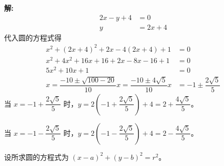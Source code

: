 \documentclass[10pt]{article}
\newcommand{\sol}{\textbf{解:} }
\begin{document}
\begin{enumerate}[leftmargin=*]
\begin{enumerate}
                \sol{}
                \begin{align*}
                  2 x-y+4 & = 0      \\
                  y       & = 2x + 4
                \end{align*}
                代入圆的方程式得
                \begin{align*}
                  x^{2} + (2x + 4)^{2} + 2x - 4(2x + 4) + 1                                   & = 0                           \\
                  x^{2} + 4x^{2} + 16x + 16 + 2x - 8x - 16 + 1                                & = 0                           \\
                  5x^{2} + 10x + 1                                                            & = 0                           \\
                  x = \dfrac{-10 \pm \sqrt{100 - 20}}{10} x = \dfrac{-10 \pm 4\sqrt{5}}{10} x & = -1 \pm \dfrac{2\sqrt{5}}{5}
                \end{align*}
                当 $x = -1 + \dfrac{2\sqrt{5}}{5}$ 时，$y = 2\left(-1 + \dfrac{2\sqrt{5}}{5}\right) + 4 = 2 + \dfrac{4\sqrt{5}}{5}$。

                当 $x = -1 - \dfrac{2\sqrt{5}}{5}$ 时，$y = 2\left(-1 - \dfrac{2\sqrt{5}}{5}\right) + 4 = 2 - \dfrac{4\sqrt{5}}{5}$。

                设所求圆的方程式为 $(x - a)^{2} + (y - b)^{2} = r^{2}$。


\end{enumerate}
\end{enumerate}
\end{document}
